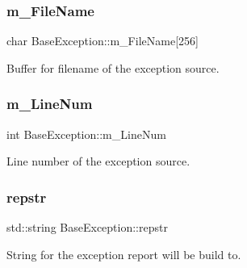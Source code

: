 \subsubsection{\texorpdfstring{m\+\_\+\+File\+Name}{m\_FileName}}
{\footnotesize\ttfamily char Base\+Exception\+::m\+\_\+\+File\+Name\mbox{[}256\mbox{]}\hspace{0.3cm}{\ttfamily [protected]}}



Buffer for filename of the exception source. 

\mbox{\label{group__EXCEPT__GROUP_ga40bdabd0e0187fc6738ce0c44564da99}} 
\subsubsection{\texorpdfstring{m\+\_\+\+Line\+Num}{m\_LineNum}}
{\footnotesize\ttfamily int Base\+Exception\+::m\+\_\+\+Line\+Num\hspace{0.3cm}{\ttfamily [protected]}}



Line number of the exception source. 

\mbox{\label{group__EXCEPT__GROUP_gad3dcd3ea212b160842c33b62955c4ff9}} 
\subsubsection{\texorpdfstring{repstr}{repstr}}
{\footnotesize\ttfamily std\+::string Base\+Exception\+::repstr\hspace{0.3cm}{\ttfamily [protected]}}



String for the exception report will be build to. 

